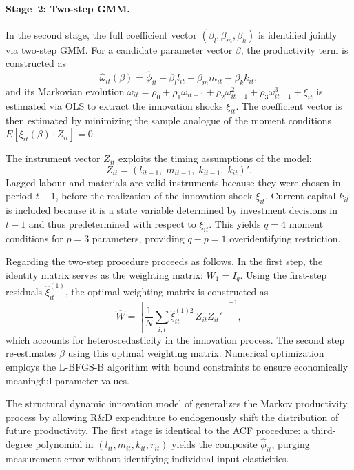 \documentclass[a4paper, 12pt]{article}
\begin{document}
\paragraph{Stage~2: Two-step GMM.}
In the second stage, the full coefficient vector $(\beta_l, \beta_m, \beta_k)$ is identified jointly via two-step GMM. For a candidate parameter vector $\beta$, the productivity term is constructed as
\begin{equation}
\hat{\omega}_{it}(\beta) = \hat{\phi}_{it} - \beta_l l_{it} - \beta_m m_{it} - \beta_k k_{it},
\end{equation}
and its Markovian evolution $\omega_{it} = \rho_0 + \rho_1 \omega_{it-1} + \rho_2 \omega_{it-1}^2 + \rho_3 \omega_{it-1}^3 + \xi_{it}$ is estimated via OLS to extract the innovation shocks $\xi_{it}$. The coefficient vector is then estimated by minimizing the sample analogue of the moment conditions $E[\xi_{it}(\beta) \cdot Z_{it}] = 0$.

The instrument vector $Z_{it}$ exploits the timing assumptions of the model:
\begin{equation}
Z_{it} = (l_{it-1},\; m_{it-1},\; k_{it-1},\; k_{it})'.
\end{equation}
Lagged labour and materials are valid instruments because they were chosen in period $t-1$, before the realization of the innovation shock $\xi_{it}$. Current capital $k_{it}$ is included because it is a state variable determined by investment decisions in $t-1$ and thus predetermined with respect to $\xi_{it}$. This yields $q = 4$ moment conditions for $p = 3$ parameters, providing $q - p = 1$ overidentifying restriction.

Regarding the two-step procedure proceeds as follows. In the first step, the identity matrix serves as the weighting matrix: $W_1 = I_q$. Using the first-step residuals $\hat\xi_{it}^{(1)}$, the optimal weighting matrix is constructed as
\begin{equation}
\hat{W} = \left[\frac{1}{N} \sum_{i,t} \hat\xi_{it}^{(1)2}\, Z_{it} Z_{it}'\right]^{-1},
\end{equation}
which accounts for heteroscedasticity in the innovation process. The second step re-estimates $\beta$ using this optimal weighting matrix. Numerical optimization employs the L-BFGS-B algorithm with bound constraints to ensure economically meaningful parameter values.


The structural dynamic innovation model of \textcite{doraszelski2013r} generalizes the Markov productivity process by allowing R\&D expenditure to endogenously shift the distribution of future productivity. The first stage is identical to the ACF procedure: a third-degree polynomial in $(l_{it}, m_{it}, k_{it}, r_{it})$ yields the composite $\hat\phi_{it}$, purging measurement error without identifying individual input elasticities.
\end{document}
